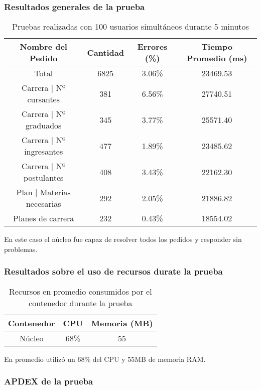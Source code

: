 \subsubsection{Resultados generales de la prueba}
\begin{table}[]
    \centering
    \makegapedcells
    \begin{tabular}{|c|c|c|c|}
    \hline
    Nombre del Pedido & Cantidad & Errores (\%) & Tiempo Promedio (ms) \\ \hline
    Total & 6825 & 3.06\% & 23469.53 \\ \hline
    Carrera | Nº cursantes & 381 & 6.56\% & 27740.51\\ \hline
    Carrera | Nº graduados & 345 & 3.77\% & 25571.40\\ \hline
    Carrera | Nº ingresantes & 477 & 1.89\% & 23485.62\\ \hline
    Carrera | Nº postulantes & 408 & 3.43\% & 22162.30\\ \hline
    Plan | Materias necesarias & 292 & 2.05\% & 21886.82\\ \hline
    Planes de carrera & 232 & 0.43\% & 18554.02\\ \hline

    \end{tabular}
    \caption{Pruebas realizadas con 100 usuarios simultáneos durante 5 minutos}
    \label{tab:tabla_planes}
\end{table}

En este caso el núcleo fue capaz de resolver todos los pedidos y responder sin problemas.

\subsubsection{Resultados sobre el uso de recursos durate la prueba}
\begin{table}[]
    \centering
    \makegapedcells
    \begin{tabular}{|c|c|c}
    \hline
    Contenedor & CPU & Memoria (MB)\\ \hline
    Núcleo & 68\% & 55 \\ \hline
    \end{tabular}
    \caption{Recursos en promedio consumidos por el contenedor durante la prueba}
    \label{tab:tabla_planes}
\end{table}

En promedio utilizó un 68\% del CPU y 55MB de memoria RAM.


\subsubsection{APDEX de la prueba}

